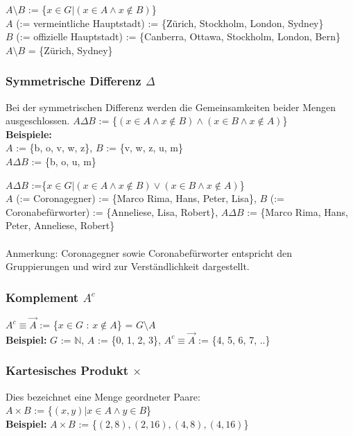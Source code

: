 \documentclass[a4paper,12pt]{article}
\begin{document}
$A \setminus B$ := \{$x \in G | (x \in A \land x \notin B)$\} \\
$A$ (:= vermeintliche Hauptstadt) := \{Zürich, Stockholm, London, Sydney\} \\
$B$ (:= offizielle Hauptstadt) := \{Canberra, Ottawa, Stockholm, London, Bern\} \\
 $A \setminus B$ = \{Zürich, Sydney\}

\subsubsection{Symmetrische Differenz $\Delta$}
Bei der symmetrischen Differenz werden die Gemeinsamkeiten beider Mengen ausgeschlossen.
$A \Delta B$ := \{$(x \in A \land x \not\in B) \land (x \in B \land x \not\in A)$\} \\
\textbf{Beispiele:} \\ 
$A$ := \{b, o, v, w, z\}, $B$ := \{v, w, z, u, m\} \\
$A \Delta B$ := \{b, o, u, m\}

$A \Delta B$ :=\{$x \in G | (x \in A \land x \notin B) \lor (x \in B \land x \notin A)$\} \\
$A$ (:= Coronagegner) := \{Marco Rima, Hans, Peter, Lisa\}, $B$ (:= Coronabefürworter) := \{Anneliese, Lisa, Robert\}, $A \Delta B$ := \{Marco Rima, Hans, Peter, Anneliese, Robert\} \\
\\
Anmerkung: Coronagegner sowie Coronabefürworter entspricht den Gruppierungen und wird zur Verständlichkeit dargestellt.

\subsubsection{Komplement $A^{c}$}
$A^{c} \equiv \vec{A}$ := \{$x \in G$ : $x \not\in A$\} = $G \setminus A$ \\
\textbf{Beispiel:} $G$ := $\mathbb{N}$, $A$ := \{0, 1, 2, 3\}, $A^{c} \equiv \vec{A}$ := \{4, 5, 6, 7, ..\}

\subsubsection{Kartesisches Produkt $\times$}
Dies bezeichnet eine Menge geordneter Paare: \\
$A \times B$ := \{$(x, y) | x \in A \land y \in B$\} \\
\textbf{Beispiel:} $A \times B$ := \{$(2,8), (2,16), (4,8), (4,16)$\}
\end{document}
